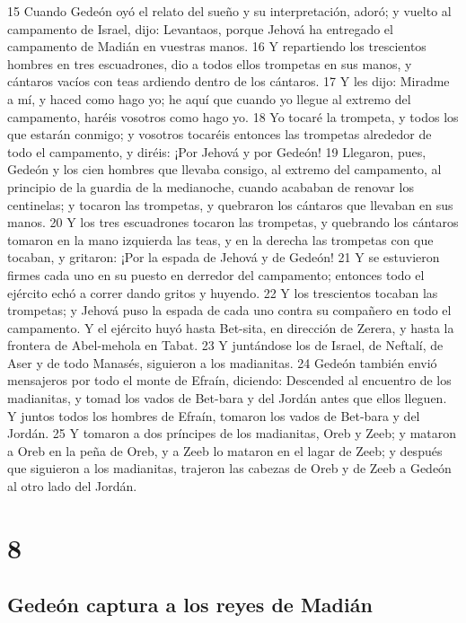 15 Cuando Gedeón oyó el relato del sueño y su interpretación, adoró; y vuelto al campamento de Israel, dijo: Levantaos, porque Jehová ha entregado el campamento de Madián en vuestras manos.
16 Y repartiendo los trescientos hombres en tres escuadrones, dio a todos ellos trompetas en sus manos, y cántaros vacíos con teas ardiendo dentro de los cántaros.
17 Y les dijo: Miradme a mí, y haced como hago yo; he aquí que cuando yo llegue al extremo del campamento, haréis vosotros como hago yo.
18 Yo tocaré la trompeta, y todos los que estarán conmigo; y vosotros tocaréis entonces las trompetas alrededor de todo el campamento, y diréis: ¡Por Jehová y por Gedeón!
19 Llegaron, pues, Gedeón y los cien hombres que llevaba consigo, al extremo del campamento, al principio de la guardia de la medianoche, cuando acababan de renovar los centinelas; y tocaron las trompetas, y quebraron los cántaros que llevaban en sus manos.
20 Y los tres escuadrones tocaron las trompetas, y quebrando los cántaros tomaron en la mano izquierda las teas, y en la derecha las trompetas con que tocaban, y gritaron: ¡Por la espada de Jehová y de Gedeón!
21 Y se estuvieron firmes cada uno en su puesto en derredor del campamento; entonces todo el ejército echó a correr dando gritos y huyendo.
22 Y los trescientos tocaban las trompetas; y Jehová puso la espada de cada uno contra su compañero en todo el campamento. Y el ejército huyó hasta Bet-sita, en dirección de Zerera, y hasta la frontera de Abel-mehola en Tabat.
23 Y juntándose los de Israel, de Neftalí, de Aser y de todo Manasés, siguieron a los madianitas.
24 Gedeón también envió mensajeros por todo el monte de Efraín, diciendo: Descended al encuentro de los madianitas, y tomad los vados de Bet-bara y del Jordán antes que ellos lleguen. Y juntos todos los hombres de Efraín, tomaron los vados de Bet-bara y del Jordán.
25 Y tomaron a dos príncipes de los madianitas, Oreb y Zeeb; y mataron a Oreb en la peña de Oreb, y a Zeeb lo mataron en el lagar de Zeeb; y después que siguieron a los madianitas, trajeron las cabezas de Oreb y de Zeeb a Gedeón al otro lado del Jordán.

\chapter{8}

\section*{Gedeón captura a los reyes de Madián}

